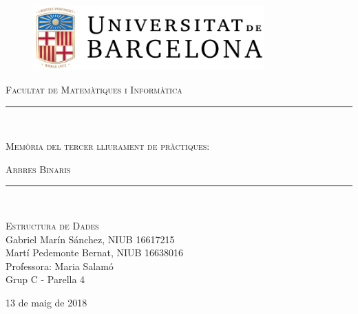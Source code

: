 \begin{titlepage}
\begin{center}
\vspace*{-1.5in}
\vspace*{1in}
\begin{figure}[htb]
\begin{center}
\includegraphics[height=2.5cm]{logonou.png}
\end{center}
\end{figure}
\begin{large}
\textsc{Facultat de Matemàtiques i Informàtica}
\end{large}
\rule{130mm}{0.1mm}\\
\vspace*{0.6in}
\begin{Huge}
\textsc{Memòria del tercer lliurament de pràctiques:}
 \\[\baselineskip]
\end{Huge}
\begin{HUGE}
\textsc{Arbres Binaris}\\
\end{HUGE}
\vspace*{1.75in}
\rule{80mm}{0.1mm}\\
\vspace*{0.1in}
\begin{Large}
\textsc{Estructura de Dades}\\
\vspace*{0.3in}
Gabriel Marín Sánchez, NIUB 16617215 \\
Martí Pedemonte Bernat, NIUB 16638016\\
\vspace*{0.3in}
Professora: Maria Salamó\\
Grup C - Parella 4\\
\end{Large}
\vspace*{0.3in}
\begin{large}
13 de maig de 2018\\
\end{large}
\end{center}
\end{titlepage}